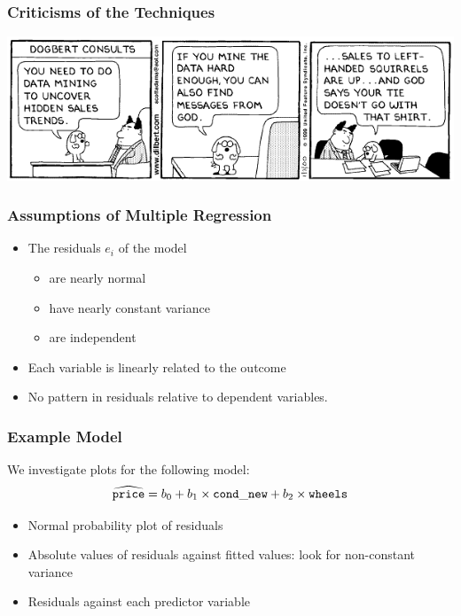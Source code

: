 \documentclass[handout]{beamer}
\begin{document}
\begin{frame}[fragile]
\frametitle{Criticisms of the Techniques}
\begin{center}
\includegraphics[width=\textwidth]{figure/dilbert.png}
\end{center}
\end{frame}


\begin{frame}[fragile]
\frametitle{Assumptions of Multiple Regression}

\begin{itemize}
\item The residuals $e_i$ of the model 
\begin{itemize}
\pause\item are nearly normal
\pause\item have nearly constant variance
\pause\item are independent
\end{itemize}
\pause\item Each variable is linearly related to the outcome
\pause\item No pattern in residuals relative to dependent variables.  
\end{itemize}

\end{frame}


\begin{frame}[fragile]
\frametitle{Example Model}
We investigate plots for the following model:
\[
\widehat{{\tt price}} = b_0 + b_1 \times {\tt cond\_new} + b_2 \times {\tt wheels}
\]

\begin{itemize}
\pause\item Normal probability plot of residuals
\pause\item Absolute values of residuals against fitted values: look for non-constant variance
\pause\item Residuals against each predictor variable
\end{itemize}

\end{frame}
\end{document}
